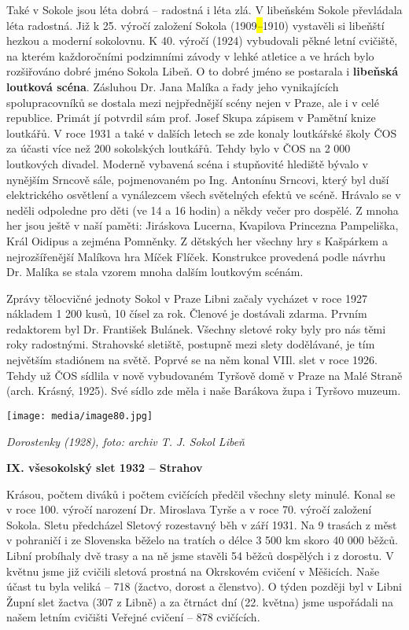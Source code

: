 Také v Sokole jsou léta dobrá --⁠⁠⁠⁠⁠⁠ radostná i léta zlá. V libeňském Sokole
převládala léta radostná. Již k 25. výročí založení Sokola
(1909\emph{\hl{--}}1910) vystavěli si libeňští hezkou a moderní
sokolovnu. K 40. výročí (1924) vybudovali pěkné letní cvičiště, na
kterém každoročními podzimními závody v lehké atletice a ve hrách bylo
rozšiřováno dobré jméno Sokola Libeň. O to dobré jméno se postarala i
\textbf{libeňská loutková scéna}. Zásluhou Dr. Jana Malíka a řady jeho
vynikajících spolupracovníků se dostala mezi nejpřednější scény nejen v
Praze, ale i v celé republice. Primát jí potvrdil sám prof. Josef Skupa
zápisem v Pamětní knize loutkářů. V roce 1931 a také v dalších letech se
zde konaly loutkářské školy ČOS za účasti více než 200 sokolských
loutkářů. Tehdy bylo v ČOS na 2 000 loutkových divadel. Moderně vybavená
scéna i stupňovité hlediště bývalo v nynějším Srncově sále, pojmenovaném
po Ing. Antonínu Srncovi, který byl duší elektrického osvětlení a
vynálezcem všech světelných efektů ve scéně. Hrávalo se v neděli
odpoledne pro děti (ve 14 a 16 hodin) a někdy večer pro dospělé. Z mnoha
her jsou ještě v naší paměti: Jiráskova Lucerna, Kvapilova Princezna
Pampeliška, Král Oidipus a zejména Pomněnky. Z dětských her všechny hry
s Kašpárkem a nejrozšířenější Malíkova hra Míček Flíček. Konstrukce
provedená podle návrhu Dr. Malíka se stala vzorem mnoha dalším loutkovým
scénám.

Zprávy tělocvičné jednoty Sokol v Praze Libni začaly vycházet v roce
1927 nákladem 1 200 kusů, 10 čísel za rok. Členové je dostávali zdarma.
Prvním redaktorem byl Dr. František Bulánek. Všechny sletové roky byly
pro nás těmi roky radostnými. Strahovské sletiště, postupně mezi slety
dodělávané, je tím největším stadiónem na světě. Poprvé se na něm konal
VIIl. slet v roce 1926. Tehdy už ČOS sídlila v nově vybudovaném Tyršově
domě v Praze na Malé Straně (arch. Krásný, 1925). Své sídlo zde měla i
naše Barákova župa i Tyršovo muzeum.

\texttt{[image: media/image80.jpg]}

\emph{Dorostenky (1928), foto: archiv T. J. Sokol Libeň}

\textbf{IX. všesokolský slet 1932 -- Strahov}

Krásou, počtem diváků i počtem cvičících předčil všechny slety minulé.
Konal se v roce 100. výročí narození Dr. Miroslava Tyrše a v roce 70.
výročí založení Sokola. Sletu předcházel Sletový rozestavný běh v září
1931. Na 9 trasách z měst v pohraničí i ze Slovenska běželo na tratích o
délce 3 500 km skoro 40 000 běžců. Libní probíhaly dvě trasy a na ně
jsme stavěli 54 běžců dospělých i z dorostu. V květnu jsme již cvičili
sletová prostná na Okrskovém cvičení v Měšicích. Naše účast tu byla
veliká -- 718 (žactvo, dorost a členstvo). O týden později byl v Libni
Župní slet žactva (307 z Libně) a za čtrnáct dní (22. května) jsme
uspořádali na našem letním cvičišti Veřejné cvičení -- 878 cvičících.

